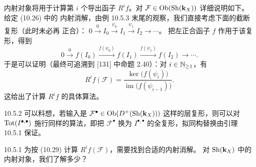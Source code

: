 内射对象将用于计算第 $i$ 个导出函子 $R^if$。对
$\mathcal F\in\operatorname{Ob}(\operatorname{Sh}(\mathbf{k}_X))$ 详细说明如下。给定 (10.26) 中的
内射消解，由例 10.5.3 末尾的观察，我们直接考虑下面的截断复形（此时未必再
正合）：
$0\xrightarrow{0}I_0\xrightarrow{\psi_0}I_1\xrightarrow{\psi_1}I_2\to\cdots$。
把左正合函子 $f$ 作用于该复形，得到
\begin{equation}\tag{10.28}
  0\xrightarrow{0}f(I_0)\xrightarrow{f(\psi_0)}f(I_1)
  \xrightarrow{f(\psi_1)}f(I_2)\to\cdots .
\end{equation}
于是可以证明（最终可追溯到 [131] 中命题 2.40）：对 $i\in\mathbb{N}_{\ge1}$，有
\begin{equation}\tag{10.29}
  R^if(\mathcal F)=\frac{\ker\bigl(f(\psi_i)\bigr)}
  {\operatorname{im}\bigl(f(\psi_{i-1})\bigr)} .
\end{equation}
这给出了计算 $R^if$ 的具体算法。


\begin{wrem}{10.5.2}
可以料想，若输入是 $\mathcal F^{\bullet}\in\operatorname{Ob}(D^+(\operatorname{Sh}(\mathbf{k}_X)))$
这样的层复形，则可以对 $\operatorname{Tot}(I^{\bullet,\bullet})$ 施行同样的算法，即把
$\mathcal F^{\bullet}$ 换为 $I^{\bullet,\bullet}$ 的全复形，拟同构替换由引理
10.5.1 保证。
\end{wrem}

\begin{wque}{10.5.1}
为按 (10.29) 计算 $R^if(\mathcal F)$，需要找到合适的内射消解。
对 $\operatorname{Sh}(\mathbf{k}_X)$ 中的内射对象，我们了解多少？
\end{wque}

